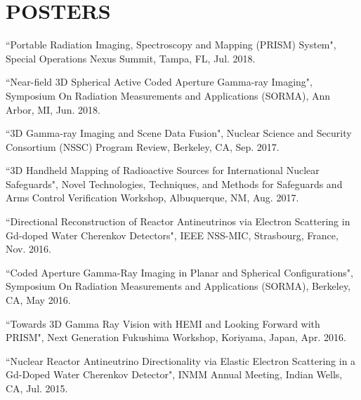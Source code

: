 \section{\small{POSTERS}}

 \begin{thebibliography}{3}
 \raggedright
 \vspace{10pt}

 ``Portable Radiation Imaging, Spectroscopy and Mapping (PRISM) System", Special Operations Nexus Summit, Tampa, FL, Jul. 2018.
 
 ``Near-field 3D Spherical Active Coded Aperture Gamma-ray Imaging", Symposium On Radiation Measurements and Applications (SORMA), Ann Arbor, MI, Jun. 2018.
 
 ``3D Gamma-ray Imaging and Scene Data Fusion", Nuclear Science and Security Consortium (NSSC) Program Review, Berkeley, CA, Sep. 2017.

 ``3D Handheld Mapping of Radioactive Sources for International Nuclear Safeguards", Novel Technologies, Techniques, and Methods for Safeguards and Arms Control Verification Workshop, Albuquerque, NM, Aug. 2017.

 ``Directional Reconstruction of Reactor Antineutrinos via Electron Scattering in Gd-doped Water Cherenkov Detectors", IEEE NSS-MIC, Strasbourg, France, Nov. 2016. 

  ``Coded Aperture Gamma-Ray Imaging in Planar and Spherical Configurations", Symposium On Radiation Measurements and Applications (SORMA), Berkeley, CA, May 2016.

  ``Towards 3D Gamma Ray Vision with HEMI and Looking Forward with PRISM", Next Generation Fukushima Workshop, Koriyama, Japan, Apr. 2016.
 
  ``Nuclear Reactor Antineutrino Directionality via Elastic Electron Scattering in a Gd-Doped Water Cherenkov Detector", INMM Annual Meeting, Indian Wells, CA, Jul. 2015.
 
 \end{thebibliography}
